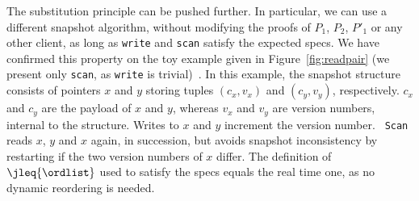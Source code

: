 The substitution principle can be pushed further. In particular, we
can use a different snapshot algorithm, without modifying the proofs
of $P_1$, $P_2$, $P'_1$ or any other client, as long as {\tt write}
and {\tt scan} satisfy the expected specs.
%
We have confirmed this property on the toy example given in
Figure~\ref{fig:readpair} (we present only {\tt scan}, as {\tt write}
is trivial)~\cite{Sergey-al:ESOP15}. In this example, the snapshot
structure consists of pointers $x$ and $y$ storing tuples $(c_x, v_x)$
and $(c_y, v_y)$, respectively. $c_x$ and $c_y$ are the payload of $x$
and $y$, whereas $v_x$ and $v_y$ are version numbers, internal to the
structure. Writes to $x$ and $y$ increment the version number. {\tt
  Scan} reads $x$, $y$ and $x$ again, in succession, but avoids
snapshot inconsistency by restarting if the two version numbers of $x$
differ. The definition of $\jleq{\ordlist}$ used to satisfy the specs equals the
real time one, as no dynamic reordering is needed.



